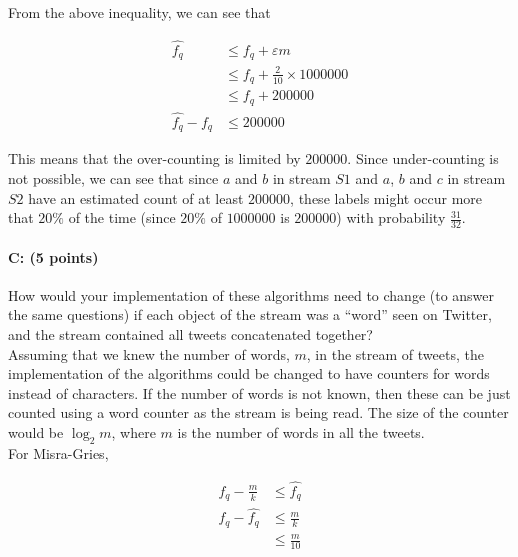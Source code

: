 \documentclass[11pt]{article}
\begin{document}
From the above inequality, we can see that 

\begin{equation*}
\begin{aligned}
\hat{f_q} &\leq f_q + \varepsilon m\\
&\leq f_q + \frac{2}{10} \times \num[group-separator={,}]{1000000}\\
&\leq f_q + \num[group-separator={,}]{200000}\\
\hat{f_q} - f_q  &\leq \num[group-separator={,}]{200000}
\end{aligned}
\end{equation*}

This means that the over-counting is limited by $\num[group-separator={,}]{200000}$. Since under-counting is not possible, we can see that since $a$ and $b$ in stream $S1$ and $a$, $b$ and $c$ in stream $S2$ have an estimated count of at least $\num[group-separator={,}]{200000}$, these labels might occur more that $20\%$ of the time (since $20\%$ of $\num[group-separator={,}]{1000000}$ is $\num[group-separator={,}]{200000}$) with probability $\frac{31}{32}$.

\paragraph{C: (5 points)} 
How would your implementation of these algorithms need to change (to answer the same questions) if each object of the stream was a \enquote{word} seen on Twitter, and the stream contained all tweets concatenated together?\\

Assuming that we knew the number of words, $m$,  in the stream of tweets, the implementation of the algorithms could be changed to have counters for words instead of characters. If the number of words is not known, then these can be just counted using a word counter as the stream is being read. The size of the counter would be $\log_2 m$, where $m$ is the number of words in all the tweets.\\

For Misra-Gries,

\begin{equation*}
\begin{aligned}
f_q - \frac{m}{k} &\leq \hat{f_q}\\
f_q - \hat{f_q} &\leq\frac{m}{k}\\
&\leq \frac{m}{10}
\end{aligned}
\end{equation*}
\end{document}
